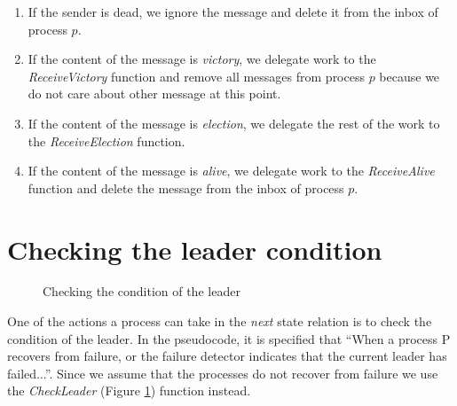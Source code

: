 \documentclass{report}
\begin{document}
\begin{enumerate}[wide, labelwidth=!, labelindent=0pt]
  \item If the sender is dead, we ignore the message and delete it from the inbox of process $p$.
  \item If the content of the message is \textit{victory}, we delegate work to the \textit{ReceiveVictory} function and remove all messages from process $p$ because we do not care about other message at this point.
  \item If the content of the message is \textit{election}, we delegate the rest of the work to the \textit{ReceiveElection} function.
  \item If the content of the message is \textit{alive}, we delegate work to the \textit{ReceiveAlive} function and delete the message from the inbox of process $p$.
\end{enumerate}

\section{Checking the leader condition}

\begin{figure}
\tlatex

\@xx{}%
%
%
%
%
%


\fl{}\bottombar\cl{}

\caption{Checking the condition of the leader}
\label{checkleader}
\end{figure}

One of the actions a process can take in the \textit{next} state relation is to check the condition of the leader.
In the pseudocode, it is specified that ``When a process P recovers from failure, or the failure detector indicates that the current leader has failed...''. Since we assume that the processes do not recover from failure we use the \textit{CheckLeader} (Figure \ref{checkleader}) function instead.
\end{document}
